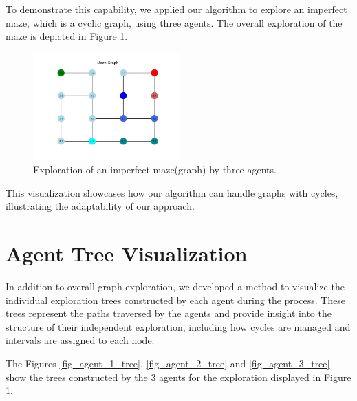 To demonstrate this capability, we applied our algorithm to explore
an imperfect maze, which is a cyclic graph, using three agents. The overall exploration of the maze is depicted in Figure \ref{fig_imperfect_maze_exploration}.

\begin{figure}[H]
\centering
\includegraphics[width=0.5\textwidth]{Cap2/maze_imperfect_exploration.png}
\caption{Exploration of an imperfect maze(graph) by three agents.}
\label{fig_imperfect_maze_exploration}
\end{figure}

This visualization showcases how our algorithm can handle graphs
with cycles, illustrating the adaptability of our approach.

\section{Agent Tree Visualization}
\label{section_method_tree_visualization}

In addition to overall graph exploration,
we developed a method to visualize the individual exploration trees constructed by each agent during the process. These trees represent the paths traversed by the agents and provide insight into the structure of their independent exploration, including how cycles are managed and intervals are assigned to each node.

The Figures \ref{fig_agent_1_tree}, \ref{fig_agent_2_tree} and \ref{fig_agent_3_tree}
show the trees constructed by the 3 agents for the exploration displayed in Figure \ref{fig_imperfect_maze_exploration}.
    
